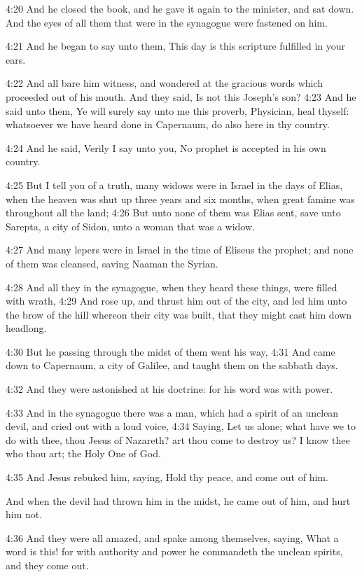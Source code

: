 4:20 And he closed the book, and he gave it again to the minister, and
sat down. And the eyes of all them that were in the synagogue were
fastened on him.

4:21 And he began to say unto them, This day is this scripture
fulfilled in your ears.

4:22 And all bare him witness, and wondered at the gracious words
which proceeded out of his mouth. And they said, Is not this Joseph's
son?  4:23 And he said unto them, Ye will surely say unto me this
proverb, Physician, heal thyself: whatsoever we have heard done in
Capernaum, do also here in thy country.

4:24 And he said, Verily I say unto you, No prophet is accepted in his
own country.

4:25 But I tell you of a truth, many widows were in Israel in the days
of Elias, when the heaven was shut up three years and six months, when
great famine was throughout all the land; 4:26 But unto none of them
was Elias sent, save unto Sarepta, a city of Sidon, unto a woman that
was a widow.

4:27 And many lepers were in Israel in the time of Eliseus the
prophet; and none of them was cleansed, saving Naaman the Syrian.

4:28 And all they in the synagogue, when they heard these things, were
filled with wrath, 4:29 And rose up, and thrust him out of the city,
and led him unto the brow of the hill whereon their city was built,
that they might cast him down headlong.

4:30 But he passing through the midst of them went his way, 4:31 And
came down to Capernaum, a city of Galilee, and taught them on the
sabbath days.

4:32 And they were astonished at his doctrine: for his word was with
power.

4:33 And in the synagogue there was a man, which had a spirit of an
unclean devil, and cried out with a loud voice, 4:34 Saying, Let us
alone; what have we to do with thee, thou Jesus of Nazareth? art thou
come to destroy us? I know thee who thou art; the Holy One of God.

4:35 And Jesus rebuked him, saying, Hold thy peace, and come out of
him.

And when the devil had thrown him in the midst, he came out of him,
and hurt him not.

4:36 And they were all amazed, and spake among themselves, saying,
What a word is this! for with authority and power he commandeth the
unclean spirits, and they come out.

